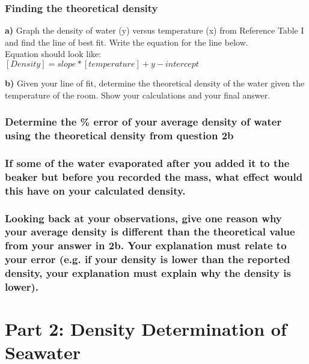 \documentclass[a4paper,10pt]{article}
\begin{document}
        \subsubsection{Finding the theoretical density}
            \begin{flushleft}
                \textbf{a)} Graph the density of water (y) versus temperature (x) from Reference Table I and find the line of best fit. Write the equation for the line below.\\
                \vspace{5mm}
                Equation should look like:\\
                \vspace{5mm}
                $[Density] = slope * [temperature] + y-intercept$
                
                \vspace{0.25in}
                
                \textbf{b)} Given your line of fit, determine the theoretical density of the water given the temperature of the room. Show your calculations and your final answer. 
            \end{flushleft}

        
    
        \subsubsection{Determine the \% error of your average density of water using the theoretical density from question 2b}

        
        \subsubsection{If some of the water evaporated after you added it to the beaker but before you recorded the mass, what effect would this have on your calculated density.}

        \subsubsection{Looking back at your observations, give one reason why your average density is different than the theoretical value from your answer in 2b. Your explanation must relate to your error (e.g. if your density is lower than the reported density, your explanation must explain why the density is lower).}
    
    \section{Part 2: Density Determination of Seawater}
        
\end{document}
